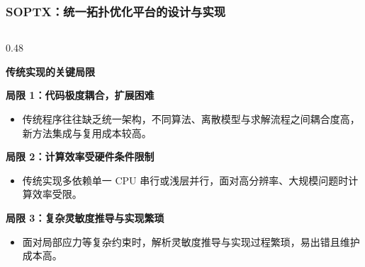 \documentclass[notheorems]{beamer}
\begin{document}
	\begin{frame}
		\frametitle{SOPTX：统一拓扑优化平台的设计与实现}
		
		\vspace{-2em}
		
		\begin{columns}[t, totalwidth=\linewidth]
			
			\begin{column}{0.48\linewidth}
				\begin{tcolorbox}[
					colback=structure.fg, colframe=structure.fg,
					coltext=white, boxrule=0pt, arc=2pt,
					top=3pt, bottom=3pt, left=6pt, right=6pt,
					]
					\centering\bfseries 传统实现的关键局限
				\end{tcolorbox}
				
				\vspace{-0.2em}
				
				\begin{tcolorbox}[
					colback=panelbg, colframe=structure.fg!50,
					boxrule=0.5pt, arc=2pt,
					top=6pt, bottom=6pt, left=6pt, right=6pt,
					]
					{\fontsize{7.5}{11}\selectfont\sffamily
						\textbf{局限 1：代码极度耦合，扩展困难}
						\setlength{\itemsep}{2pt}
						\setlength{\parsep}{0pt}
						\setlength{\topsep}{4pt}
						\begin{itemize}
							\item 传统程序往往缺乏统一架构，不同算法、离散模型与求解流程之间耦合度高，新方法集成与复用成本较高。
						\end{itemize}
						
						\vspace{3pt}
						\textbf{局限 2：计算效率受硬件条件限制}
						\setlength{\itemsep}{2pt}
						\setlength{\parsep}{0pt}
						\setlength{\topsep}{4pt}
						\begin{itemize}
							\item 传统实现多依赖单一 CPU 串行或浅层并行，面对高分辨率、大规模问题时计算效率受限。
						\end{itemize}
						
						\vspace{3pt}
						\textbf{局限 3：复杂灵敏度推导与实现繁琐}
						\setlength{\itemsep}{2pt}
						\setlength{\parsep}{0pt}
						\setlength{\topsep}{4pt}
						\begin{itemize}
							\item 面对局部应力等复杂约束时，解析灵敏度推导与实现过程繁琐，易出错且维护成本高。
						\end{itemize}
					}
				\end{tcolorbox}
			\end{column}
			

\end{columns}
\end{frame}
\end{document}

